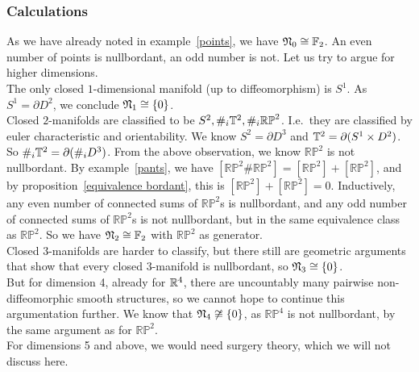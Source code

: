 \documentclass[a4paper,11pt]{article}
\begin{document}
\subsubsection{Calculations}


As we have already noted in example\ \ref{points}, we have \(\mathfrak{N}_0\cong\mathbb{F}_2\). An even number of points is nullbordant, an odd number is not. Let us try to argue for higher dimensions.\\
The only closed \(1\)-dimensional manifold (up to diffeomorphism) is \(S^1\). As \(S^1=\partial D^2\), we conclude \(\mathfrak{N}_1\cong \{0\}\).\\
Closed \(2\)-manifolds are classified to be \(S^2, \#_i\mathbb{T}^2, \#_i\mathbb{RP}^2\). I.e.\ they are classified by euler characteristic and orientability. We know \(S^2=\partial D^3\) and \(\mathbb{T}^2=\partial (S^1\times D^2)\). So \(\#_i\mathbb{T}^2=\partial(\#_i D^3)\). From the above observation, we know \(\mathbb{RP}^2\) is not nullbordant. 
By example\ \ref{pants}, we have \([\mathbb{RP}^2\#\mathbb{RP}^2]=[\mathbb{RP}^2]+[\mathbb{RP}^2]\), and by proposition\ \ref{equivalence bordant}, this is \([\mathbb{RP}^2]+[\mathbb{RP}^2]=0\). Inductively, any even number of connected sums of \(\mathbb{RP}^2\)s is nullbordant, and any odd number of connected sums of \(\mathbb{RP}^2\)s is not nullbordant, but in the same equivalence class as \(\mathbb{RP}^2\). So we have \(\mathfrak{N}_2\cong\mathbb{F}_2\) with \(\mathbb{RP}^2\) as generator.\\
Closed \(3\)-manifolds are harder to classify, but there still are geometric arguments that show that every closed \(3\)-manifold is nullbordant, so \(\mathfrak{N}_3\cong\{0\}\).\\
But for dimension 4, already for \(\mathbb{R}^4\), there are uncountably many pairwise non-diffeomorphic smooth structures, so we cannot hope to continue this argumentation further. We know that \(\mathfrak{N}_4\not\cong\{0\}\), as \(\mathbb{RP}^4\) is not nullbordant, by the same argument as for \(\mathbb{RP}^2\).\\
For dimensions 5 and above, we would need surgery theory, which we will not discuss here.
\end{document}
